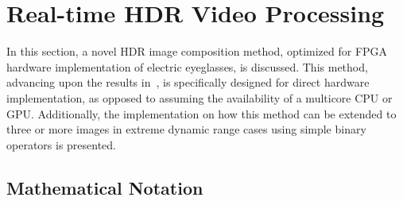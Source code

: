 %  
%  
%  
%  



\section{Real-time HDR Video Processing}
\label{realtime_hdr}

In this section, a novel HDR image composition method, optimized for FPGA hardware 
implementation of electric eyeglasses, is discussed. This method, advancing upon the results 
in~\cite{mannist,robertson2003estimation,ali2012ICASSP}, is specifically designed for direct 
hardware implementation, as opposed to assuming the availability of a multicore CPU or GPU.  
Additionally, the implementation on how this method can be extended
to three or more images in extreme dynamic range cases using simple
binary operators is presented.
 
\subsection{Mathematical Notation}

